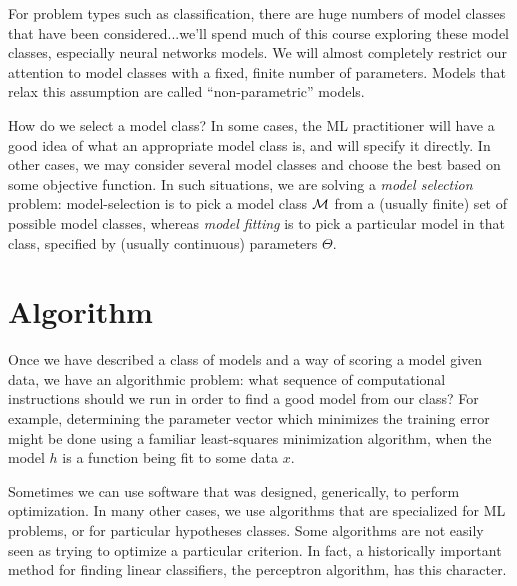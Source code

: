 For problem types such as classification, there
are huge numbers of model classes that have been considered...we'll
spend much of this course exploring these model classes, especially
neural networks models.
We will almost completely restrict our attention to model classes with
a fixed, finite number of parameters.  Models that
relax this assumption are called ``non-parametric'' models.

How do we select a model class?  In some cases, the ML
practitioner will have a good idea of what an appropriate model class
is, and will specify it directly.  In other cases, we may consider
several model classes and choose the best based on some objective function.  In such situations, we are solving a {\em
    model selection} problem: model-selection is to pick a model class
${\cal M}$ from a (usually finite) set of possible model classes, whereas {\em
    model fitting} is to pick a particular model in that class,
specified by (usually continuous) parameters $\Theta$.

\section{Algorithm}
Once we have described a class of models and a way of scoring a model
given data, we have an algorithmic problem: what sequence of
computational instructions should we run in order to find a good model
from our class?  For example, determining the parameter vector which minimizes the training error might be done using a
familiar least-squares minimization algorithm, when the model $h$ is a
function being fit to some data $x$.

Sometimes we can use software that was designed, generically, to
perform optimization.  In many other cases, we use algorithms that are
specialized for ML problems, or for particular
hypotheses classes.
Some algorithms are not easily seen as trying to optimize a particular
criterion.  In fact, a historically important method for finding linear
classifiers, the perceptron algorithm, has this character.


